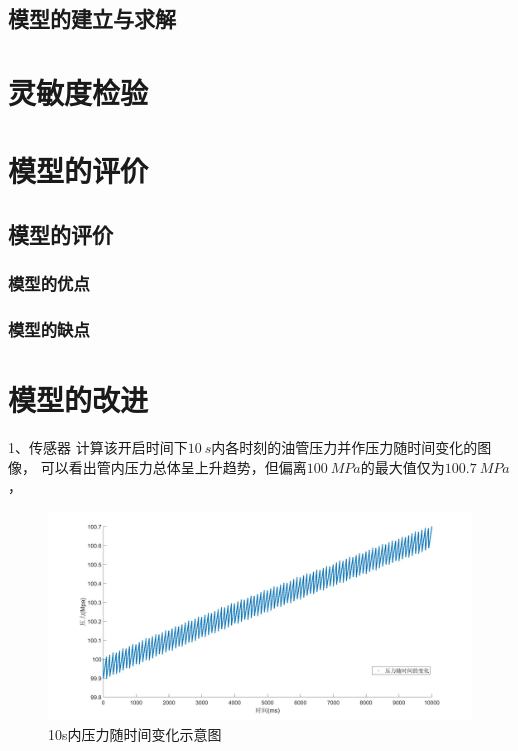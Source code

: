 \documentclass[withoutpreface,bwprint]{cumcmthesis} %
\begin{document}
\subsection{模型的建立与求解}



\section{灵敏度检验}

\section{模型的评价}
\subsection{模型的评价}
\subsubsection{模型的优点}

\subsubsection{模型的缺点}

\section{模型的改进}
1、传感器
    计算该开启时间下$10~s$内各时刻的油管压力并作压力随时间变化的图像，
    可以看出管内压力总体呈上升趋势，但偏离$100~MPa$的最大值仅为$100.7~MPa$，

    \begin{figure}[!h]
    \centering
    \includegraphics[width=.95\textwidth]{100Mpa10secs.jpg}
    \caption{10s内压力随时间变化示意图}
    \label{figure3.5}
    \end{figure}
\end{document}

